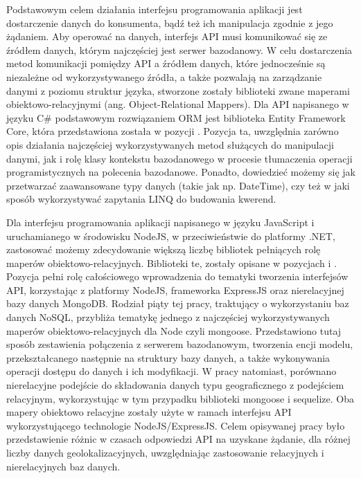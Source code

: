 Podstawowym celem działania interfejsu programowania aplikacji jest dostarczenie danych do konsumenta, bądź też ich manipulacja zgodnie z jego żądaniem. Aby operować na danych, interfejs API musi komunikować się ze źródłem danych, którym najczęściej jest serwer bazodanowy. W celu dostarczenia metod komunikacji pomiędzy API a źródłem danych, które jednocześnie są niezależne od wykorzystywanego źródła, a także pozwalają na zarządzanie danymi z poziomu struktur języka, stworzone zostały biblioteki zwane maperami obiektowo-relacyjnymi (ang. Object-Relational Mappers). Dla API napisanego w języku C\# podstawowym rozwiązaniem ORM jest biblioteka Entity Framework Core, która przedstawiona została w pozycji \cite{smith2021entity}. Pozycja ta, uwzględnia zarówno opis działania najczęściej wykorzystywanych metod służących do manipulacji danymi, jak i rolę klasy kontekstu bazodanowego w procesie tłumaczenia operacji programistycznych na polecenia bazodanowe. Ponadto, dowiedzieć możemy się jak przetwarzać zaawansowane typy danych (takie jak np. DateTime), czy też w jaki sposób wykorzystywać zapytania LINQ do budowania kwerend.

Dla interfejsu programowania aplikacji napisanego w języku JavaScript i uruchamianego w środowisku NodeJS, w przeciwieństwie do platformy .NET, zastosować możemy zdecydowanie większą liczbę bibliotek pełniących rolę maperów obiektowo-relacyjnych. Biblioteki te, zostały opisane w pozycjach \cite{bojinov2018restful} i \cite{laksono2018testing}. Pozycja \cite{bojinov2018restful} pełni rolę całościowego wprowadzenia do tematyki tworzenia interfejsów API, korzystając z platformy NodeJS, frameworka ExpressJS oraz nierelacyjnej bazy danych MongoDB. Rodział piąty tej pracy, traktujący o wykorzystaniu baz danych NoSQL, przybliża tematykę jednego z najczęściej wykorzystywanych maperów obiektowo-relacyjnych dla Node czyli mongoose. Przedstawiono tutaj sposób zestawienia połączenia z serwerem bazodanowym, tworzenia encji modelu, przekształcanego następnie na struktury bazy danych, a także wykonywania operacji dostępu do danych i ich modyfikacji. W pracy \cite{laksono2018testing} natomiast, porównano nierelacyjne podejście do składowania danych typu geograficznego z podejściem relacyjnym, wykorzystując w tym przypadku biblioteki mongoose i sequelize. Oba mapery obiektowo relacyjne zostały użyte w ramach interfejsu API wykorzystującego technologie NodeJS/ExpressJS. Celem opisywanej pracy było przedstawienie różnic w czasach odpowiedzi API na uzyskane żądanie, dla różnej liczby danych geolokalizacyjnych, uwzględniając zastosowanie relacyjnych i nierelacyjnych baz danych.

